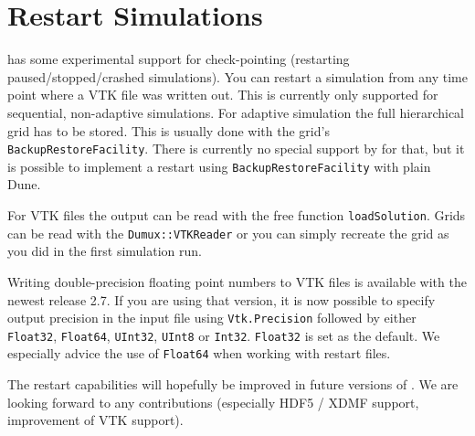\section{Restart \Dumux Simulations}
\label{sc_restartsimulations}

\Dumux has some experimental support for check-pointing (restarting paused/stopped/crashed simulations).
You can restart a \Dumux simulation from any time point where a VTK file was written out.
This is currently only supported for sequential, non-adaptive simulations. For adaptive simulation
the full hierarchical grid has to be stored. This is usually done with the grid's \texttt{BackupRestoreFacility}.
There is currently no special support by \Dumux for that, but it is possible to implement
a restart using \texttt{BackupRestoreFacility} with plain Dune.

For VTK files the output can be read with the free function \texttt{loadSolution}. Grids can be read with
the \texttt{Dumux::VTKReader} or you can simply recreate the grid as you did in the first simulation run.

Writing double-precision floating point numbers to VTK files is available with the newest \Dune release 2.7. If you are using that version, it is now possible to specify output precision in the input file using \texttt{Vtk.Precision} followed by either \texttt{Float32}, \texttt{Float64}, \texttt{UInt32}, \texttt{UInt8} or \texttt{Int32}. \texttt{Float32} is set as the default. We especially advice the use of \texttt{Float64} when working with restart files.

The restart capabilities will hopefully be improved in future versions of .
We are looking forward to any contributions (especially HDF5 / XDMF support, improvement of VTK support).
